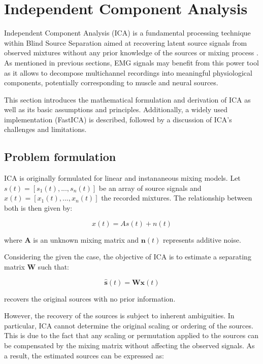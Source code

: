 \chapter{Independent Component Analysis }
\label{ch:ica}
Independent Component Analysis (ICA) is a fundamental processing technique within Blind Source Separation aimed at recovering latent source signals from observed mixtures without any prior knowledge of the sources or mixing process \cite{shi_blind_2011}. As mentioned in previous sections, EMG signals may benefit from this power tool as it allows to decompose multichannel recordings into meaningful physiological components, potentially corresponding to muscle and neural sources.


This section introduces the mathematical formulation and derivation of ICA as well as its basic assumptions and principles. Additionally, a widely used implementation (FastICA) is described, followed by a discussion of ICA's challenges and limitations.

\section{Problem formulation}
\label{sec:ica_problem_formulation}
ICA is originally formulated for linear and instananeous mixing models. Let $s(t)=[s_1(t),...,s_n(t)]$ be an array of source signals and $x(t)=[x_1(t),...,x_n(t)]$ the recorded mixtures. The relationship between both is then given by:

\begin{equation}
    x(t)=As(t)+n(t)
\end{equation}

\noindent where $\mathbf{A}$ is an unknown mixing matrix and  $\mathbf{n}(t)$ represents additive noise.

Considering the given the case, the objective of ICA is to estimate a separating matrix $\mathbf{W}$ such that:

\begin{equation}
    \hat{\mathbf{s}}(t) = \mathbf{W} \mathbf{x}(t)
\end{equation}

\noindent recovers the original sources with no prior information. 

However, the recovery of the sources is subject to inherent ambiguities. In particular, ICA cannot determine the original scaling or ordering of the sources. This is due to the fact that any scaling or permutation applied to the sources can be compensated by the mixing matrix without affecting the observed signals. As a result, the estimated sources can be expressed as:

